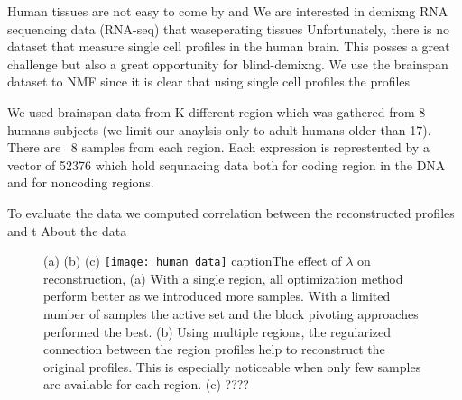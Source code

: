 



Human tissues are not easy to come by and 
We are interested in demixng RNA sequencing data (RNA-seq) that waseperating tissues
Unfortunately, there is no dataset that measure single cell profiles in the human brain. This posses a great challenge but also a great opportunity for blind-demixng. 
We use the brainspan dataset \cite{brainspan} to 
NMF since it is clear that using single cell profiles the profiles


We used brainspan data from K different region which was gathered from 8 humans subjects (we limit our anaylsis only to adult humans older than 17). There are ~8 samples from each region. Each expression is represtented by a vector of 52376 which hold sequnacing data both for coding region in the DNA and for noncoding regions. 

To evaluate the data we computed correlation between the reconstructed profiles and t
About the data




\begin{figure}[!hbt]
   (a) \hspace{120pt}(b) \hspace{120pt}(c) \hspace{120pt}
   \centering
     \texttt{[image: human\_data]}
     caption{The effect of $\lambda$ on reconstruction}, 
    (a)  With a single region, all optimization method perform better as we introduced more samples. With a limited number of samples the active set and the block pivoting approaches performed the best. (b) Using multiple regions, the regularized connection between the region profiles help to reconstruct the original profiles. This is especially noticeable when only few samples are available for each region. (c) ????
    \label{fig:controlled_exp}
\end{figure}
